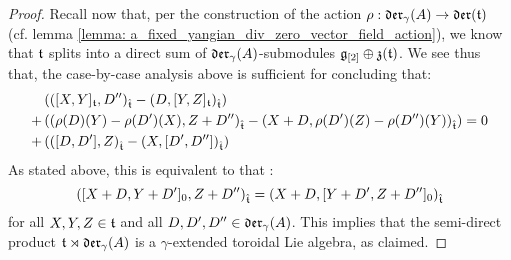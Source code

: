 \begin{proof}
                Recall now that, per the construction of the action $\rho: \mathfrak{der}_{\gamma}(A) \to \mathfrak{der}(\mathfrak{t})$ (cf. lemma \ref{lemma: a_fixed_yangian_div_zero_vector_field_action}), we know that $\mathfrak{t}$ splits into a direct sum of $\mathfrak{der}_{\gamma}(A)$-submodules $\mathfrak{g}_{[2]} \oplus \mathfrak{z}(\mathfrak{t})$. We see thus that, the case-by-case analysis above is sufficient for concluding that:
                    $$
                        \begin{aligned}
                            & \left( ( [X, Y]_{\mathfrak{t}}, D'')_{\hat{\mathfrak{t}}} - (D, [Y, Z]_{\mathfrak{t}})_{\hat{\mathfrak{t}}} \right)
                            \\
                            + & \left( \left(\rho(D)(Y) - \rho(D')(X), Z + D'' \right)_{\hat{\mathfrak{t}}} - \left( X + D, \rho(D')(Z) - \rho(D'')(Y) \right)_{\hat{\mathfrak{t}}} \right)
                            \\
                            + & \left( \left( [D, D'], Z \right)_{\hat{\mathfrak{t}}} - \left(X, [D', D'']\right)_{\hat{\mathfrak{t}}} \right)
                        \end{aligned}
                        = 0
                    $$
                As stated above, this is equivalent to that :
                    $$\left( [X + D, Y + D']_0, Z + D'' \right)_{\hat{\mathfrak{t}}} = \left( X + D, [Y + D', Z + D'']_0 \right)_{\hat{\mathfrak{t}}}$$
                for all $X, Y, Z \in \mathfrak{t}$ and all $D, D', D'' \in \mathfrak{der}_{\gamma}(A)$. This implies that the semi-direct product $\mathfrak{t} \rtimes \mathfrak{der}_{\gamma}(A)$ is a $\gamma$-extended toroidal Lie algebra, as claimed.
            \end{proof}
            
